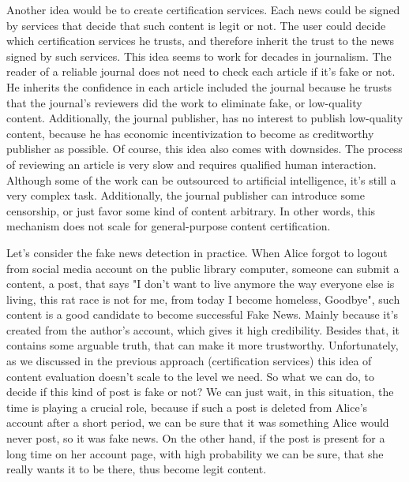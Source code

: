 \documentclass[nostrict]{szablonPG}
\begin{document}
Another idea would be to create certification services. Each news could be signed by services that decide that such content is legit or not. The user could decide which certification services he trusts, and therefore inherit the trust to the news signed by such services. This idea seems to work for decades in journalism. The reader of a reliable journal does not need to check each article if it's fake or not. He inherits the confidence in each article included the journal because he trusts that the journal's reviewers did the work to eliminate fake, or low-quality content. Additionally, the journal publisher, has no interest to publish low-quality content, because he has economic incentivization to become as creditworthy publisher as possible.
Of course, this idea also comes with downsides. The process of reviewing an article is very slow and requires qualified human interaction. Although some of the work can be outsourced to artificial intelligence, it's still a very complex task. Additionally, the journal publisher can introduce some censorship, or just favor some kind of content arbitrary. In other words, this mechanism does not scale for general-purpose content certification.

Let's consider the fake news detection in practice. When Alice forgot to logout from social media account on the public library computer, someone can submit a content, a post, that says "I don't want to live anymore the way everyone else is living, this rat race is not for me, from today I become homeless, Goodbye", such content is a good candidate to become successful Fake News. Mainly because it's created from the author's account, which gives it high credibility. Besides that, it contains some arguable truth, that can make it more trustworthy. Unfortunately, as we discussed in the previous approach (certification services) this idea of content evaluation doesn't scale to the level we need. So what we can do, to decide if this kind of post is fake or not? We can just wait, in this situation, the time is playing a crucial role, because if such a post is deleted from Alice's account after a short period, we can be sure that it was something Alice would never post, so it was fake news. On the other hand, if the post is present for a long time on her account page, with high probability we can be sure, that she really wants it to be there, thus become legit content.
\end{document}
